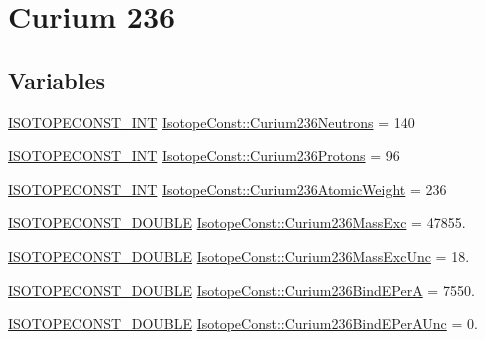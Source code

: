 \hypertarget{group___isotope_const-_curium-_cm236}{}\section{Curium 236}
\label{group___isotope_const-_curium-_cm236}
\subsection*{Variables}
\begin{DoxyCompactItemize}
\item 
\mbox{\hyperlink{group___isotope_const-_macros_ga5f18360b3e99483a35c32d789e62621c}{I\+S\+O\+T\+O\+P\+E\+C\+O\+N\+S\+T\+\_\+\+I\+NT}} \mbox{\hyperlink{group___isotope_const-_curium-_cm236_ga7e64e98ea6699e98144d017450c86ce3}{Isotope\+Const\+::\+Curium236\+Neutrons}} = 140
\item 
\mbox{\hyperlink{group___isotope_const-_macros_ga5f18360b3e99483a35c32d789e62621c}{I\+S\+O\+T\+O\+P\+E\+C\+O\+N\+S\+T\+\_\+\+I\+NT}} \mbox{\hyperlink{group___isotope_const-_curium-_cm236_ga9ec6701ef1a961336d57ca43443821a0}{Isotope\+Const\+::\+Curium236\+Protons}} = 96
\item 
\mbox{\hyperlink{group___isotope_const-_macros_ga5f18360b3e99483a35c32d789e62621c}{I\+S\+O\+T\+O\+P\+E\+C\+O\+N\+S\+T\+\_\+\+I\+NT}} \mbox{\hyperlink{group___isotope_const-_curium-_cm236_gaa960b88b43436ec90365a83550474b04}{Isotope\+Const\+::\+Curium236\+Atomic\+Weight}} = 236
\item 
\mbox{\hyperlink{group___isotope_const-_macros_ga8f45a7272ce02c0b4c65c44636ed719a}{I\+S\+O\+T\+O\+P\+E\+C\+O\+N\+S\+T\+\_\+\+D\+O\+U\+B\+LE}} \mbox{\hyperlink{group___isotope_const-_curium-_cm236_ga6eb6c0ff3e74425c9b9856157b81efc8}{Isotope\+Const\+::\+Curium236\+Mass\+Exc}} = 47855.
\item 
\mbox{\hyperlink{group___isotope_const-_macros_ga8f45a7272ce02c0b4c65c44636ed719a}{I\+S\+O\+T\+O\+P\+E\+C\+O\+N\+S\+T\+\_\+\+D\+O\+U\+B\+LE}} \mbox{\hyperlink{group___isotope_const-_curium-_cm236_gaea5022ca752e30592e61d341420822c2}{Isotope\+Const\+::\+Curium236\+Mass\+Exc\+Unc}} = 18.
\item 
\mbox{\hyperlink{group___isotope_const-_macros_ga8f45a7272ce02c0b4c65c44636ed719a}{I\+S\+O\+T\+O\+P\+E\+C\+O\+N\+S\+T\+\_\+\+D\+O\+U\+B\+LE}} \mbox{\hyperlink{group___isotope_const-_curium-_cm236_gaabb3a5aaa78843bb10aa0e008a90bd37}{Isotope\+Const\+::\+Curium236\+Bind\+E\+PerA}} = 7550.
\item 
\mbox{\hyperlink{group___isotope_const-_macros_ga8f45a7272ce02c0b4c65c44636ed719a}{I\+S\+O\+T\+O\+P\+E\+C\+O\+N\+S\+T\+\_\+\+D\+O\+U\+B\+LE}} \mbox{\hyperlink{group___isotope_const-_curium-_cm236_ga173abc469695524376de5bba7aabaead}{Isotope\+Const\+::\+Curium236\+Bind\+E\+Per\+A\+Unc}} = 0.

\end{DoxyCompactItemize}
